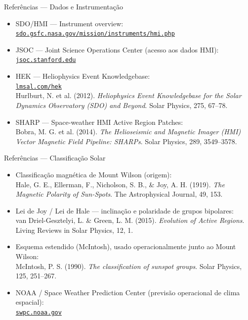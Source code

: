 \documentclass[aspectratio=169]{beamer}
\begin{document}
\begin{frame}{Referências — Dados e Instrumentação}
  \small
  \begin{itemize}
    \item SDO/HMI — Instrument overview:\\
      \href{https://sdo.gsfc.nasa.gov/mission/instruments/hmi.php}{\texttt{sdo.gsfc.nasa.gov/mission/instruments/hmi.php}}
    \item JSOC — Joint Science Operations Center (acesso aos dados HMI):\\
      \href{http://jsoc.stanford.edu}{\texttt{jsoc.stanford.edu}}
    \item HEK — Heliophysics Event Knowledgebase:\\
      \href{https://www.lmsal.com/hek/}{\texttt{lmsal.com/hek}}\\
      \footnotesize Hurlburt, N. et al. (2012). \textit{Heliophysics Event Knowledgebase for the Solar Dynamics Observatory (SDO) and Beyond}. Solar Physics, 275, 67–78.
    \item SHARP — Space-weather HMI Active Region Patches:\\
      \footnotesize Bobra, M. G. et al. (2014). \textit{The Helioseismic and Magnetic Imager (HMI) Vector Magnetic Field Pipeline: SHARPs}. Solar Physics, 289, 3549–3578.
  \end{itemize}
\end{frame}

\begin{frame}{Referências — Classificação Solar}
  \small
  \begin{itemize}
    \item Classificação magnética de Mount Wilson (origem):\\
      \footnotesize Hale, G. E., Ellerman, F., Nicholson, S. B., \& Joy, A. H. (1919). \textit{The Magnetic Polarity of Sun-Spots}. The Astrophysical Journal, 49, 153.
    \item \normalsize Lei de Joy / Lei de Hale — inclinação e polaridade de grupos bipolares:\\
      \footnotesize van Driel-Gesztelyi, L. \& Green, L. M. (2015). \textit{Evolution of Active Regions}. Living Reviews in Solar Physics, 12, 1.
    \item \normalsize Esquema estendido (McIntosh), usado operacionalmente junto ao Mount Wilson:\\
      \footnotesize McIntosh, P. S. (1990). \textit{The classification of sunspot groups}. Solar Physics, 125, 251–267.
    \item \normalsize NOAA / Space Weather Prediction Center (previsão operacional de clima espacial):\\
      \href{https://www.swpc.noaa.gov/}{\texttt{swpc.noaa.gov}}
  \end{itemize}
\end{frame}
\end{document}
